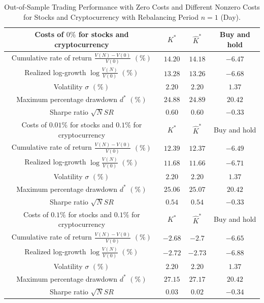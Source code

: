 \documentclass[10pt]{article} %
\begin{document}
	\begin{table}[h!] 
		\centering
		\caption{Out-of-Sample Trading Performance with Zero Costs and Different Nonzero Costs for Stocks and %
			Cryptocurrency with Rebalancing Period $n=1$ (Day).} 
		\begin{tabular}{|c|c|c|c|}
			\hline
			Costs of $0\%$ for stocks and cryptocurrency & $K^*$ & $\widehat{K}^*$ & Buy and hold \\
			\hline
			Cumulative rate of return $\frac{V(N)-V(0)}{V(0)}$ $(\%)$ & $14.20$ & $14.18$ & $-6.47$ \\
			\hline
			Realized log-growth $\log\frac{V(N)}{V(0)}$ $(\%)$ & $13.28$ & $13.26$ & $-6.68$\\
			\hline
			Volatility $\sigma$ $(\%)$ & $2.20$ & $2.20$ & $1.37$\\
			\hline
			Maximum percentage drawdown $d^*$ $(\%)$ & $24.88$ & $24.89$ & $20.42$ \\
			\hline
			Sharpe ratio $\sqrt{N}SR$ &  $0.60$ &  $0.60$ &  $-0.33$ \\
			\hline
			\hline
			\hline
			Costs of $0.01\%$ for stocks and $0.1\%$ for cryptocurrency & $K^*$ & $\widehat{K}^*$ & Buy and hold \\
			\hline
			Cumulative rate of return $\frac{V(N)-V(0)}{V(0)}$ $(\%)$ & $12.39$ & $12.37$ & $-6.49$ \\
			\hline
			Realized log-growth $\log\frac{V(N)}{V(0)}$ $(\%)$ & $11.68$ & $11.66$ & $-6.71$\\
			\hline
			Volatility $\sigma$ $(\%)$ & $2.20$ & $2.20$ & $1.37$\\
			\hline
			Maximum percentage drawdown $d^*$ $(\%)$ & $25.06$ & $25.07$ & $20.42$ \\
			\hline
			Sharpe ratio $\sqrt{N}SR$ &  $0.54$ &  $0.54$ &  $-0.33$ \\
			\hline
			\hline
			\hline
			Costs of $0.1\%$ for stocks and $0.1\%$ for cryptocurrency  & $K^*$ & $\widehat{K}^*$ & Buy and hold \\
			\hline
			Cumulative rate of return $\frac{V(N)-V(0)}{V(0)}$ $(\%)$ & $-2.68$ & $-2.7$ & $-6.65$\\
			\hline
			Realized log-growth $\log\frac{V(N)}{V(0)}$ $(\%)$ & $-2.72$ & $-2.73$ & $-6.88$ \\
			\hline
			Volatility $\sigma$ $(\%)$ & $2.20$ & $2.20$ & $1.37$ \\
			\hline
			Maximum percentage drawdown $d^*$ $(\%)$ & $27.15$ & $27.17$ & $20.42$ \\
			\hline
			Sharpe ratio $\sqrt{N}SR$ &  $0.03$ &  $0.02$ &  $-0.34$ \\

\end{tabular}
\end{table}
\end{document}
